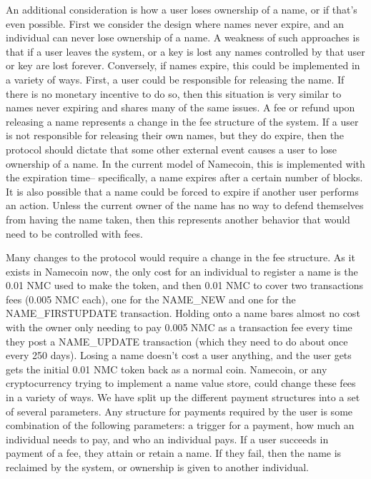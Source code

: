     An additional consideration is how a user loses ownership of a name, or if that's even possible. First we consider the design where names never expire, and an individual can never lose ownership of a name. A weakness of such approaches is that if a user leaves the system, or a key is lost any names controlled by that user or key are lost forever. Conversely, if names expire, this could be implemented in a variety of ways. First, a user could be responsible for releasing the name. If there is no monetary incentive to do so, then this situation is very similar to names never expiring and shares many of the same issues. A fee or refund upon releasing a name represents a change in the fee structure of the system. If a user is not responsible for releasing their own names, but they do expire, then the protocol should dictate that some other external event causes a user to lose ownership of a name. In the current model of Namecoin, this is implemented with the expiration time-- specifically, a name expires after a certain number of blocks. It is also possible that a name could be forced to expire if another user performs an action. Unless the current owner of the name has no way to defend themselves from having the name taken, then this represents another behavior that would need to be controlled with fees. 

    Many changes to the protocol would require a change in the fee structure. As it exists in Namecoin now, the only cost for an individual to register a name is the 0.01 NMC used to make the token, and then 0.01 NMC to cover two transactions fees (0.005 NMC each), one for the NAME\_NEW and one for the NAME\_FIRSTUPDATE transaction. Holding onto a name bares almost no cost with the owner only needing to pay 0.005 NMC as a transaction fee every time they post a NAME\_UPDATE transaction (which they need to do about once every 250 days). Losing a name doesn't cost a user anything, and the user gets gets the initial 0.01 NMC token back as a normal coin. Namecoin, or any cryptocurrency trying to implement a name value store, could change these fees in a variety of ways. We have split up the different payment structures into a set of several parameters. Any structure for payments required by the user is some combination of the following parameters: a trigger for a payment, how much an individual needs to pay, and who an individual pays. If a user succeeds in payment of a fee, they attain or retain a name. If they fail, then the name is reclaimed by the system, or ownership is given to another individual. 

